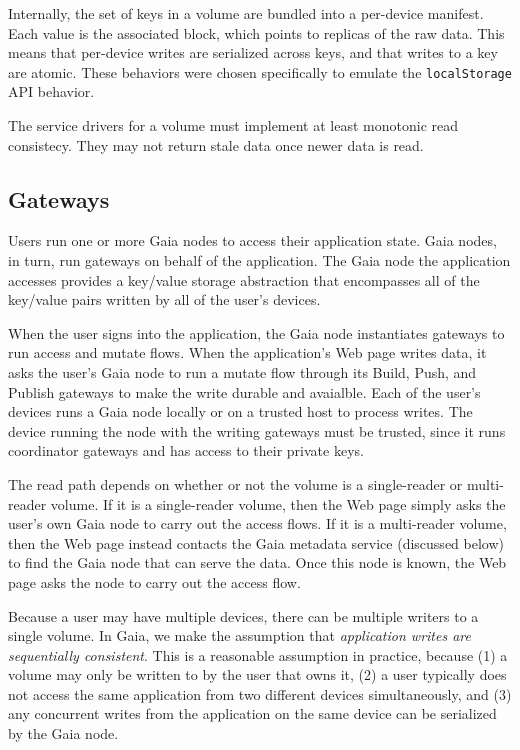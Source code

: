 Internally, the set of keys in a volume are bundled into a per-device manifest.
Each value is the associated block, which points to replicas of the raw data.
This means that per-device writes are serialized
across keys, and that writes to a key are atomic.  These behaviors were chosen
specifically to emulate the \texttt{localStorage} API behavior.

The service drivers for a volume must implement at least monotonic read
consistecy.  They may not return stale data once newer data is read.

\subsection{Gateways}

Users run one or more Gaia nodes to access their application state.  Gaia nodes,
in turn, run gateways on behalf of the application.  The Gaia node the
application accesses provides a key/value storage abstraction that encompasses
all of the key/value pairs written by all of the user's devices.

When the user signs into the application, the Gaia node instantiates gateways to
run access and mutate flows.  When the application's Web page writes data,
it asks the user's Gaia node to run a mutate flow through its Build, Push, and
Publish gateways to make the write durable and avaialble.
Each of the user's devices runs a Gaia node locally or on a trusted host to
process writes.  The device running the node with the writing gateways
must be trusted, since it runs coordinator gateways and has access to their
private keys.

The read path depends on whether or not the volume is a single-reader or
multi-reader volume.  If it is a single-reader volume, then the Web page simply
asks the user's own Gaia node to carry out the access flows.  If it is a
multi-reader volume, then the Web page instead contacts the Gaia metadata
service (discussed below) to find the Gaia node that can serve the data.
Once this node is known, the Web page asks the node to
carry out the access flow.

Because a user may have multiple devices, there can be multiple writers to
a single volume.  In Gaia, we make the assumption that \emph{application writes are
sequentially consistent}.  This is a reasonable assumption in practice, because
(1) a volume may only be written to by the user
that owns it, (2) a user typically does not access the same application from
two different devices simultaneously, and (3) any concurrent writes from the
application on the same device can be serialized by the Gaia node.

